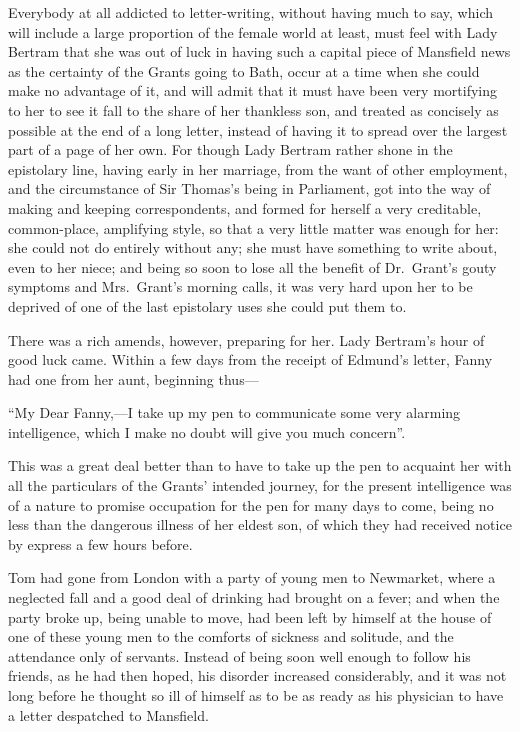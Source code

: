 Everybody at all addicted to letter-writing, without
having much to say, which will include a large proportion
of the female world at least, must feel with Lady Bertram
that she was out of luck in having such a capital piece of
Mansfield news as the certainty of the Grants going to Bath,
occur at a time when she could make no advantage of it,
and will admit that it must have been very mortifying
to her to see it fall to the share of her thankless son,
and treated as concisely as possible at the end of a
long letter, instead of having it to spread over the largest
part of a page of her own.  For though Lady Bertram rather
shone in the epistolary line, having early in her marriage,
from the want of other employment, and the circumstance
of Sir Thomas's being in Parliament, got into the way
of making and keeping correspondents, and formed for
herself a very creditable, common-place, amplifying style,
so that a very little matter was enough for her:  she could
not do entirely without any; she must have something
to write about, even to her niece; and being so soon
to lose all the benefit of Dr.\ Grant's gouty symptoms
and Mrs.\ Grant's morning calls, it was very hard upon her
to be deprived of one of the last epistolary uses she could put
them to.

There was a rich amends, however, preparing for her.
Lady Bertram's hour of good luck came.  Within a few days
from the receipt of Edmund's letter, Fanny had one from
her aunt, beginning thus---%

``My Dear Fanny,---I take up my pen to communicate some
very alarming intelligence, which I make no doubt will
give you much concern''.

This was a great deal better than to have to take up the pen
to acquaint her with all the particulars of the Grants'
intended journey, for the present intelligence was of a
nature to promise occupation for the pen for many days
to come, being no less than the dangerous illness of her
eldest son, of which they had received notice by express
a few hours before.

Tom had gone from London with a party of young men
to Newmarket, where a neglected fall and a good deal
of drinking had brought on a fever; and when the party
broke up, being unable to move, had been left by himself
at the house of one of these young men to the comforts of
sickness and solitude, and the attendance only of servants.
Instead of being soon well enough to follow his friends,
as he had then hoped, his disorder increased considerably,
and it was not long before he thought so ill of himself
as to be as ready as his physician to have a letter
despatched to Mansfield.

